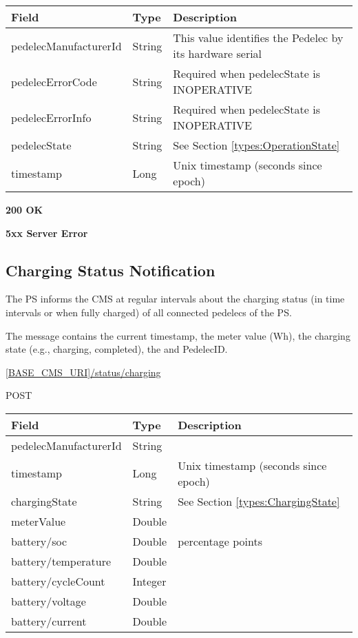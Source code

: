 \begin{table}[!h]
\vspace{-7mm}
\begin{tabularx}{\linewidth}{ | l | l | X | }
  \hline
  \rowcolor{table-head}
  Field & Type & Description \\
  \hline
  pedelecManufacturerId & String 		& This value identifies the Pedelec by its hardware serial\\
  pedelecErrorCode & String & Required when pedelecState is INOPERATIVE \\
  pedelecErrorInfo & String & Required when pedelecState is INOPERATIVE \\
  pedelecState & String & See Section \ref{types:OperationState} \\
  timestamp & Long & Unix timestamp (seconds since epoch) \\
  \hline
\end{tabularx}
\end{table}

 \textbf{200 OK}

 \textbf{5xx Server Error}


\subsection{Charging Status Notification}
\label{ps:charging-status}

The \acs{PS} informs the \acs{CMS} at regular intervals about the charging status (in time intervals or when fully charged) of all connected pedelecs of the \acs{PS}.

The message contains the current timestamp, the meter value (Wh), the charging state (e.g., charging, completed), the and PedelecID.

 \url{[BASE_CMS_URI]/status/charging}

 POST

\begin{table}[!h]
\vspace{-7mm}
\begin{tabularx}{\linewidth}{ | l | l | X | }
  \hline
  \rowcolor{table-head}
  Field & Type & Description \\
  \hline
  	pedelecManufacturerId & String			& \\
  	timestamp & Long			& Unix timestamp (seconds since epoch) \\
  	chargingState & String		& See Section \ref{types:ChargingState} \\	
  	meterValue & Double & \\
  	battery/soc & Double & percentage points \\
  	battery/temperature & Double &  \\
  	battery/cycleCount & Integer &  \\
  	battery/voltage & Double &  \\
  	battery/current & Double &  \\
    \hline
\end{tabularx}
\end{table}

